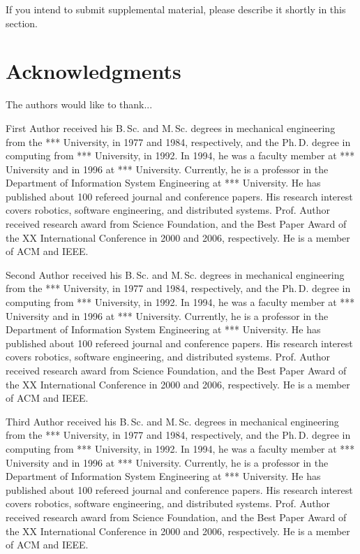 \documentclass[10pt,journal,compsoc]{joser1}
\begin{document}
If you intend to submit supplemental material, please describe it
shortly in this section.


\section*{Acknowledgments}
The authors would like to thank...






\begin{IEEEbiography}[{author}]{First Author}
received his B.\,Sc. and
M.\,Sc. degrees in mechanical engineering from the *** University,
in 1977 and 1984, respectively, and the Ph.\,D. degree in
computing from *** University, in 1992. In 1994, he was a
faculty member at *** University and in 1996 at ***
University. Currently, he is a professor in the Department of
Information System Engineering at *** University.
He has published about 100 refereed journal and conference papers.
His research interest covers robotics, software engineering, and distributed systems.
Prof. Author received research award from Science Foundation, and
the Best Paper Award of the XX International Conference in 2000 and
2006, respectively. He is a member of ACM and IEEE.
\end{IEEEbiography}

\begin{IEEEbiography}[{author}]{Second Author}
received his B.\,Sc. and
M.\,Sc. degrees in mechanical engineering from the *** University,
in 1977 and 1984, respectively, and the Ph.\,D. degree in
computing from *** University, in 1992. In 1994, he was a
faculty member at *** University and in 1996 at ***
University. Currently, he is a professor in the Department of
Information System Engineering at *** University.
He has published about 100 refereed journal and conference papers.
His research interest covers robotics, software engineering, and distributed systems.
Prof. Author received research award from Science Foundation, and
the Best Paper Award of the XX International Conference in 2000 and
2006, respectively. He is a member of ACM and IEEE.
\end{IEEEbiography}


\begin{IEEEbiography}[{author}]{Third Author}
received his B.\,Sc. and
M.\,Sc. degrees in mechanical engineering from the *** University,
in 1977 and 1984, respectively, and the Ph.\,D. degree in
computing from *** University, in 1992. In 1994, he was a
faculty member at *** University and in 1996 at ***
University. Currently, he is a professor in the Department of
Information System Engineering at *** University.
He has published about 100 refereed journal and conference papers.
His research interest covers robotics, software engineering, and distributed systems.
Prof. Author received research award from Science Foundation, and
the Best Paper Award of the XX International Conference in 2000 and
2006, respectively. He is a member of ACM and IEEE.
\end{IEEEbiography}
\end{document}
